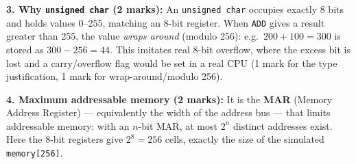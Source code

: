 \documentclass[11pt]{article}
\begin{document}
\begin{corrige}
\textbf{3. Why \texttt{unsigned char} (2 marks):}
An \texttt{unsigned char} occupies exactly 8 bits and holds values 0--255, matching an 8-bit register. When \texttt{ADD} gives a result greater than 255, the value \emph{wraps around} (modulo 256): e.g.\ $200 + 100 = 300$ is stored as $300 - 256 = 44$. This imitates real 8-bit overflow, where the excess bit is lost and a carry/overflow flag would be set in a real CPU (1 mark for the type justification, 1 mark for wrap-around/modulo 256).

\textbf{4. Maximum addressable memory (2 marks):}
It is the \textbf{MAR} (Memory Address Register) — equivalently the width of the address bus — that limits addressable memory: with an $n$-bit MAR, at most $2^n$ distinct addresses exist. Here the 8-bit registers give $2^8 = 256$ cells, exactly the size of the simulated \texttt{memory[256]}.
\end{corrige}
\end{document}
